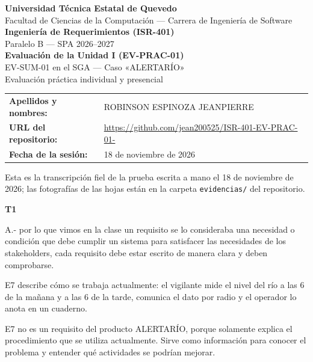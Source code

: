 \documentclass[11pt,a4paper]{article}
\newcommand{\apartado}[1]{\par\noindent\textbf{#1}\par\vspace{4pt}}
\begin{document}
\begin{titlepage}
\centering

{\bfseries Universidad Técnica Estatal de Quevedo}\\[4pt]
Facultad de Ciencias de la Computación --- Carrera de Ingeniería de Software\\[10pt]

{\bfseries Ingeniería de Requerimientos (ISR-401)}\\
Paralelo B --- SPA 2026--2027\\[10pt]

{\bfseries Evaluación de la Unidad I (EV-PRAC-01)}\\
EV-SUM-01 en el SGA --- Caso «ALERTARÍO»\\[10pt]

Evaluación práctica individual y presencial

\vfill

\noindent\begin{tabular}{@{}ll@{}}
\textbf{Apellidos y nombres:} & ROBINSON ESPINOZA JEANPIERRE\\
\textbf{URL del repositorio:} & \url{https://github.com/jean200525/ISR-401-EV-PRAC-01-}\\
\textbf{Fecha de la sesión:} & 18 de noviembre de 2026\\
\end{tabular}

\vfill

Esta es la transcripción fiel de la prueba escrita a mano el 18 de noviembre de 2026; las fotografías de las hojas están en la carpeta \texttt{evidencias/} del repositorio.

\end{titlepage}

\newpage

\apartado{T1}

A.- por lo que vimos en la clase un requisito se lo consideraba una necesidad o condición que debe cumplir un sistema para satisfacer las necesidades de los stakeholders, cada requisito debe estar escrito de manera clara y deben comprobarse.

E7 describe cómo se trabaja actualmente: el vigilante mide el nivel del río a las 6 de la mañana y a las 6 de la tarde, comunica el dato por radio y el operador lo anota en un cuaderno.

E7 no es un requisito del producto ALERTARÍO, porque solamente explica el procedimiento que se utiliza actualmente. Sirve como información para conocer el problema y entender qué actividades se podrían mejorar.
\end{document}
